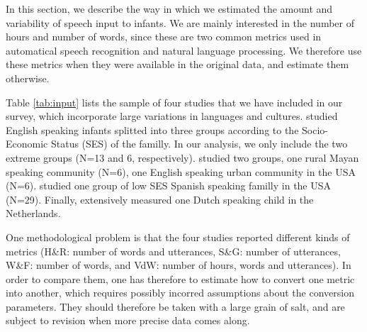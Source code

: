 \documentclass[jou,apacite]{apa6}
\begin{document}
\begin{table*}[]
{\begin{tabular}{llllllllll}
		\\
		\hline
	\end{tabular}
}


\end{table*}
In this section, we describe the way in which we estimated the amount and variability of speech input to infants.  We are mainly interested in the number of hours and number of words, since these are two common metrics used in automatical speech recognition and natural language processing. We therefore use these metrics when they were available in the original data, and estimate them otherwise. 

Table \ref{tab:input} lists the sample of four studies that we have included in our survey, which incorporate large variations in languages and cultures.  studied English speaking infants splitted into three groups according to the Socio-Economic Status (SES) of the familly. In our analysis, we only include the two extreme groups (N=13 and 6, respectively).  studied two groups, one rural Mayan speaking community (N=6), one English speaking urban community in the USA (N=6).  studied one group of low SES Spanish speaking familly in the USA (N=29). Finally,  extensively measured one Dutch speaking child in the Netherlands.

One methodological problem is that the four studies reported different kinds of metrics (H\&R: number of words and utterances, S\&G: number of utterances, W\&F: number of words, and VdW: number of hours, words and utterances). In order to compare them, one has therefore to estimate how to convert one metric into another, which requires possibly incorred assumptions about the conversion parameters. They should therefore be taken with a  large grain of salt, and are subject to revision when more precise data comes along.
\end{document}
